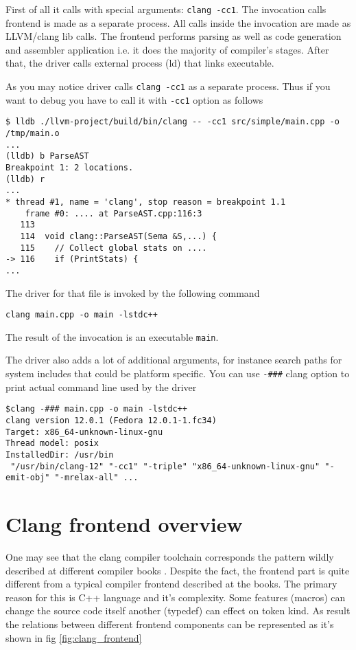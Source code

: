 First of all it calls \clang with special arguments: \texttt{clang
  -cc1}. The invocation calls \clang frontend is made as a separate process. All
calls inside the invocation are made as LLVM/clang lib calls. The frontend
performs parsing as well as code generation and assembler application i.e. it
does the majority of compiler's stages. After that, the driver calls external
process (ld) that links executable.

As you may notice \clang driver calls \texttt{clang -cc1} as a
separate process. Thus if you want to debug \clang you have to call it with
\texttt{-cc1} option as follows
\begin{verbatim}
$ lldb ./llvm-project/build/bin/clang -- -cc1 src/simple/main.cpp -o /tmp/main.o
...
(lldb) b ParseAST
Breakpoint 1: 2 locations.
(lldb) r
...
* thread #1, name = 'clang', stop reason = breakpoint 1.1
    frame #0: .... at ParseAST.cpp:116:3
   113  
   114  void clang::ParseAST(Sema &S,...) {
   115    // Collect global stats on ....
-> 116    if (PrintStats) {
...
\end{verbatim}

The driver for that file is invoked by the following command
\begin{verbatim}
clang main.cpp -o main -lstdc++
\end{verbatim}
The result of the invocation is an executable \texttt{main}. 

The driver also adds a lot of additional arguments, for instance
search paths for system includes that could be platform specific.
You can use \texttt{-###} clang option to print actual
command line used by the driver
\begin{verbatim}
$clang -### main.cpp -o main -lstdc++
clang version 12.0.1 (Fedora 12.0.1-1.fc34)
Target: x86_64-unknown-linux-gnu
Thread model: posix
InstalledDir: /usr/bin
 "/usr/bin/clang-12" "-cc1" "-triple" "x86_64-unknown-linux-gnu" "-emit-obj" "-mrelax-all" ...
\end{verbatim}

\section{Clang frontend overview}
One may see that the clang compiler toolchain corresponds the pattern
wildly described at different compiler books
\cite{book:engineering_a_compiler}. Despite the fact, the frontend
part is quite different from a typical compiler frontend described at
the books. The primary reason for this is C++ language and it's
complexity. Some features (macros) can change the source code itself
another (typedef) can effect on token kind. As result the relations
between different frontend components can be represented as it's shown
in fig \ref{fig:clang_frontend}

